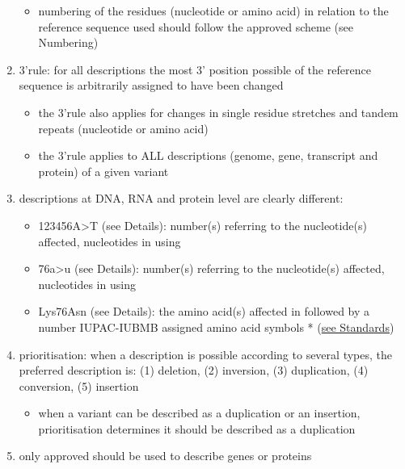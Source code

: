 \begin{enumerate}
\begin{itemize}
		\item numbering of the residues (nucleotide or amino acid) in relation to the reference sequence used should follow the approved scheme (see Numbering)
	\end{itemize}

	
	\item 3’rule: for all descriptions the most 3’ position possible of the reference sequence is arbitrarily assigned to have been changed 
	\begin{itemize}
		\item the 3’rule also applies for changes in single residue stretches and tandem repeats (nucleotide or amino acid)
		\item the 3’rule applies to ALL descriptions (genome, gene, transcript and protein) of a given variant
	\end{itemize}

	\item descriptions at DNA, RNA and protein level are clearly different: 
	\begin{itemize}
		\item {} 123456A>T (see Details): number(s) referring to the nucleotide(s) affected, nucleotides in  using 
		\item {} 76a>u (see Details): number(s) referring to the nucleotide(s) affected, nucleotides in  using 
		\item {} Lys76Asn (see Details): the amino acid(s) affected in  followed by a number IUPAC-IUBMB assigned amino acid symbols *  (\href{http://varnomen.hgvs.org/bg-material/standards/#aacode}{see Standards})
	\end{itemize}

	\item prioritisation: when a description is possible according to several types, the preferred description is: (1) deletion, (2) inversion, (3) duplication, (4) conversion, (5) insertion 
	\begin{itemize}
		\item when a variant can be described as a duplication or an insertion, prioritisation determines it should be described as a duplication
	\end{itemize}
	
	\item only approved  should be used to describe genes or proteins
	
\end{enumerate}

